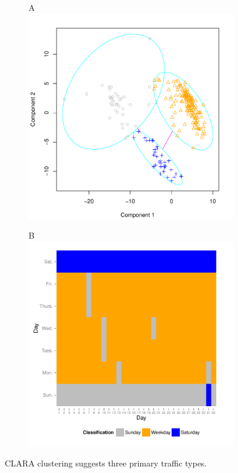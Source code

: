 \documentclass{report}
\begin{document}
\begin{figure}[H]
\centering
\begin{subfigure}[b]{0.45\textwidth}
\centering
A\\
\includegraphics{upstat_report-clustering}
\end{subfigure}
\begin{subfigure}[b]{0.45\textwidth}
\centering
B\\
\includegraphics{upstat_report-007}
\end{subfigure}
\caption{CLARA clustering suggests three primary traffic types.}
\label{fig:clustering}
\end{figure}
\end{document}
